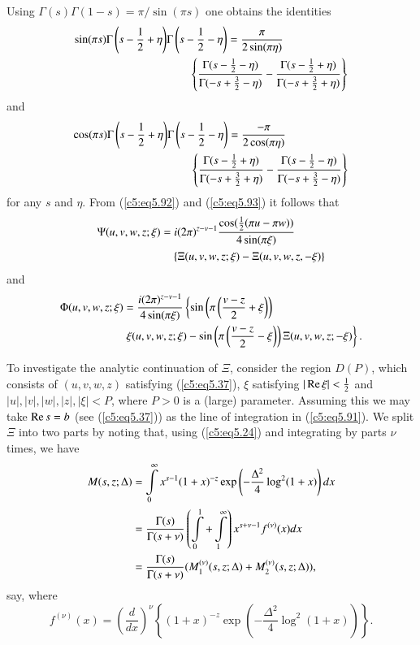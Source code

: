 Using $\Gamma (s) \Gamma (1-s) = \pi / \sin (\pi s)$ one obtains the identities
\begin{align}
\sin (\pi s) \Gamma \left(s - \frac{1}{2} + \eta \right) & \Gamma
\left(s-\frac{1}{2} - \eta \right)  = \frac{\pi}{2 \sin (\pi \eta)}
\notag\\ 
& \qquad  \left\{ \frac{\Gamma (s-\frac{1}{2} - \eta)}{ \Gamma (-s +
  \frac{3}{2} - \eta)} - \frac{\Gamma (s - \frac{1}{2} + \eta)}{
  \Gamma (-s + \frac{3}{2} + \eta )}  \right\}
\label{c5:eq5.92} 
\end{align}
and 
\begin{align}
\cos (\pi s) \Gamma \left(s-\frac{1}{2} + \eta \right) & \Gamma
\left(s - \frac{1}{2} - \eta \right) = \frac{-\pi}{2 \cos (\pi
  \eta)}\notag\\ 
& \qquad \left\{\frac{\Gamma (s - \frac{1}{2} + \eta)}{\Gamma (-s +
  \frac{3}{2} + \eta)} - \frac{\Gamma (s-\frac{1}{2} -\eta)}{\Gamma
  (-s + \frac{3}{2} -\eta)} \right\}\label{c5:eq5.93} 
\end{align}
for any $s$ and $\eta$. From (\ref{c5:eq5.92}) and (\ref{c5:eq5.93})
it follows that 
\begin{align}
\Psi (u,v,w,z;\xi) & = i (2\pi)^{z-v-1} \frac{\cos (\frac{1}{2} (\pi u
  - \pi w))}{4\sin (\pi \xi)} \notag\\ 
& \quad \left\{ \Xi (u,v,w,z;\xi) - \Xi
(u,v,w,z,-\xi)\right\}\label{c5:eq5.94} 
\end{align}
and 
\begin{align}
 \Phi (u,v,w,z;\xi) & = 
\frac{i(2\pi)^{z-v-1}}{4\sin (\pi \xi)} \left\{  \sin \left(\pi \left(\frac{v-z}{2} + \xi \right) \right) \right. \label{c5:eq5.95}\\
&  \left. \xi (u,v,w,z;\xi) - \sin \left(\pi \left(\frac{v-z}{2} - \xi
\right) \right) \Xi (u,v,w,z;-\xi)\right\}.\notag 
\end{align}

To investigate the analytic continuation of $\Xi$, consider the region
$D(P)$, which consists of $(u,v,w,z)$ satisfying (\ref{c5:eq5.37}),
$\xi$ satisfying $|\operatorname{Re} \xi| < \frac{1}{2}$ and $|u|, |v| , |w|, |z|,
|\xi| <P$, where $P>0$ is a (large) parameter. Assuming this we may
take $\operatorname{Re} s = b$ (see (\ref{c5:eq5.37})) as the line of integration in
(\ref{c5:eq5.91}). We split $\Xi$ into two parts by noting that, using
(\ref{c5:eq5.24}) and integrating by parts $\nu$ times, we have  
\begin{align}
M(s,z;\Delta) & = \int\limits^\infty_0 x^{s-1} (1+x)^{-z} \exp
\left(-\frac{\Delta^2}{4} \log^2 (1+x) \right)
dx\label{c5:eq5.96}\\ 
& = \frac{\Gamma(s)}{\Gamma (s+\nu)} \left(\int\limits^1_0 +
\int\limits^\infty_1 \right) x^{s+\nu-1} f^{(\nu)} (x) dx \notag\\ 
& = \frac{\Gamma(s)}{\Gamma(s+\nu)} (M^{(\nu)}_1 (s, z;\Delta) +
M^{(\nu)}_2 (s,z;\Delta)),\notag 
\end{align}
say, where 
$$
f^{(\nu)} (x) = \left(\frac{d}{dx} \right)^\nu \left\{(1+x)^{-z} \exp
\left(-\frac{\Delta^2}{4} \log^2 (1+x) \right)\right\}.  
$$

